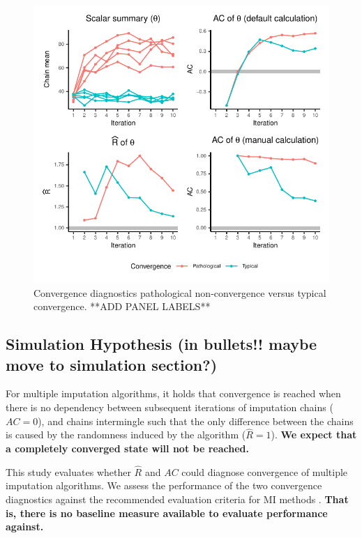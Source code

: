 \documentclass[Royal,times,sageh]{sagej}
\begin{document}
\begin{figure}

{\centering \includegraphics{manuscript_files/figure-latex/diagnostics-1} 

}

\caption{Convergence diagnostics pathological non-convergence versus typical convergence. **ADD PANEL LABELS**}\label{fig:diagnostics}
\end{figure}

\hypertarget{simulation-hypothesis-in-bullets-maybe-move-to-simulation-section}{%
\subsection{Simulation Hypothesis (in bullets!! maybe move to simulation
section?)}\label{simulation-hypothesis-in-bullets-maybe-move-to-simulation-section}}

For multiple imputation algorithms, it holds that convergence is reached
when there is no dependency between subsequent iterations of imputation
chains (\(AC = 0\)), and chains intermingle such that the only
difference between the chains is caused by the randomness induced by the
algorithm (\(\widehat{R} = 1\)). \textbf{We expect that a completely
converged state will not be reached.}

This study evaluates whether \(\widehat{R}\) and \(AC\) could diagnose
convergence of multiple imputation algorithms. We assess the performance
of the two convergence diagnostics against the recommended evaluation
criteria for MI methods \citep[i.e., average bias, average confidence
interval width, and empirical coverage rate across simulations;][\(\S\)
2.5.2]{buur18}. \textbf{That is, there is no baseline measure available
to evaluate performance against.}
\end{document}
